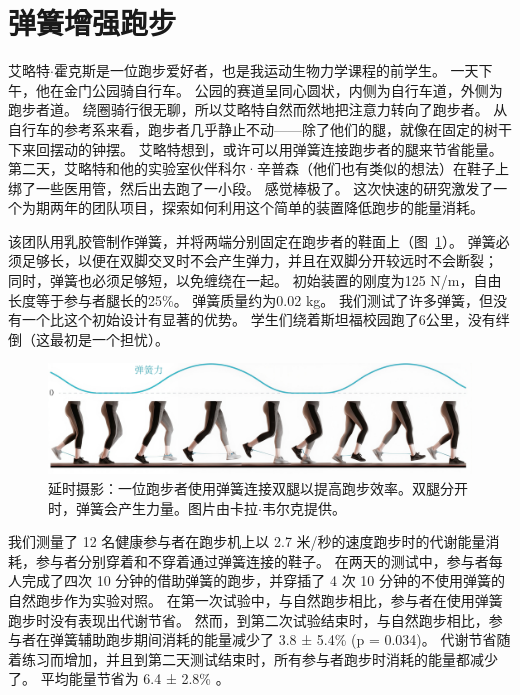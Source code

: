 \section{弹簧增强跑步}

艾略特$\cdot$霍克斯是一位跑步爱好者，也是我运动生物力学课程的前学生。
一天下午，他在金门公园骑自行车。
公园的赛道呈同心圆状，内侧为自行车道，外侧为跑步者道。
绕圈骑行很无聊，所以艾略特自然而然地把注意力转向了跑步者。
从自行车的参考系来看，跑步者几乎静止不动——除了他们的腿，就像在固定的树干下来回摆动的钟摆。
艾略特想到，或许可以用弹簧连接跑步者的腿来节省能量。
第二天，艾略特和他的实验室伙伴科尔·辛普森（他们也有类似的想法）在鞋子上绑了一些医用管，然后出去跑了一小段。
感觉棒极了。
这次快速的研究激发了一个为期两年的团队项目，探索如何利用这个简单的装置降低跑步的能量消耗。


该团队用乳胶管制作弹簧，并将两端分别固定在跑步者的鞋面上（图~\ref{fig:12_15}）。
弹簧必须足够长，以便在双脚交叉时不会产生弹力，并且在双脚分开较远时不会断裂；
同时，弹簧也必须足够短，以免缠绕在一起。
初始装置的刚度为125 N/m，自由长度等于参与者腿长的25\%。
弹簧质量约为0.02 kg。
我们测试了许多弹簧，但没有一个比这个初始设计有显著的优势。
学生们绕着斯坦福校园跑了6公里，没有绊倒（这最初是一个担忧）。


\begin{figure}[!htb]
	\centering
	\includegraphics[width=1.0\linewidth]{chap12/12_15}
	\caption{延时摄影：一位跑步者使用弹簧连接双腿以提高跑步效率。双腿分开时，弹簧会产生力量。图片由卡拉$\cdot$韦尔克提供。 \label{fig:12_15}}
\end{figure}


我们测量了 12 名健康参与者在跑步机上以 2.7 米/秒的速度跑步时的代谢能量消耗，参与者分别穿着和不穿着通过弹簧连接的鞋子。
在两天的测试中，参与者每人完成了四次 10 分钟的借助弹簧的跑步，并穿插了 4 次 10 分钟的不使用弹簧的自然跑步作为实验对照。
在第一次试验中，与自然跑步相比，参与者在使用弹簧跑步时没有表现出代谢节省。
然而，到第二次试验结束时，与自然跑步相比，参与者在弹簧辅助跑步期间消耗的能量减少了 3.8 ± 5.4\% (p = 0.034)。
代谢节省随着练习而增加，并且到第二天测试结束时，所有参与者跑步时消耗的能量都减少了。
平均能量节省为 6.4 ± 2.8\% \cite{simpson2019connecting}。







